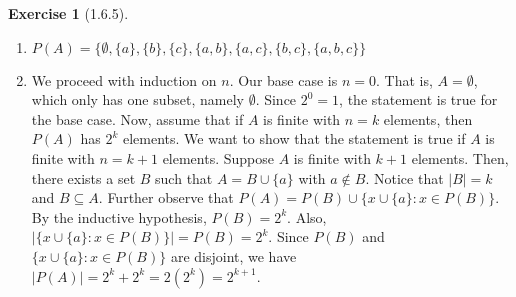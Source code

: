 \documentclass{amsart}
\theoremstyle{definition}
\newtheorem{exercise}{Exercise}
\newcommand{\abs}[1]{|#1|}
\newcommand{\card}[1]{\abs{#1}}
\newcommand{\st}{\mathrel{:}}
\begin{document}
\begin{exercise}[1.6.5]
  \begin{enumerate}[label={(\alph*)}]
    \item $P(A) = \{\emptyset, \{a\}, \{b\}, \{c\}, \{a, b\}, \{a, c\}, \{b,
      c\}, \{a, b, c\}\}$
    \item We proceed with induction on $n$. Our base case is $n = 0$. That is,
      $A = \emptyset$, which only has one subset, namely $\emptyset$. Since $2^0
      = 1$, the statement is true for the base case. Now, assume that if $A$ is
      finite with $n = k$ elements, then $P(A)$ has $2^k$ elements. We want to
      show that the statement is true if $A$ is finite with $n = k + 1$
      elements. Suppose $A$ is finite with $k + 1$ elements. Then, there exists
      a set $B$ such that $A = B \cup \{a\}$ with $a \notin B$. Notice that
      $\card{B} = k$ and $B \subseteq A$. Further observe that $P(A) = P(B) \cup
      \{x \cup \{a\} \st x \in P(B)\}$. By the inductive hypothesis, $P(B) =
      2^k$. Also, $\card{\{x \cup \{a\} \st x \in P(B)\}} = P(B) = 2^k$.
      Since $P(B)$ and $\{x \cup \{a\} \st x \in P(B)\}$ are disjoint, we have
      $\card{P(A)} = 2^k + 2^k = 2(2^k) = 2^{k+1}$.
  \end{enumerate}
\end{exercise}
\end{document}
